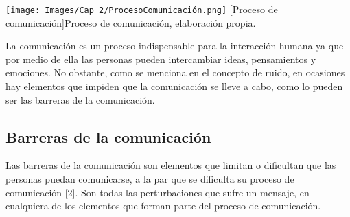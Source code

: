 \begin{center}
    \texttt{[image: Images/Cap 2/ProcesoComunicación.png]}
    [Proceso de comunicación]{Proceso de comunicación, elaboración propia.} 
\end{center}

La comunicación es un proceso indispensable para la interacción humana ya que por medio de ella las personas pueden intercambiar ideas, pensamientos y emociones. No obstante, como se menciona en el concepto de ruido, en ocasiones hay elementos que impiden que la comunicación se lleve a cabo, como lo pueden ser las barreras de la comunicación.
\subsection{Barreras de la comunicación}
Las barreras de la comunicación son elementos que limitan o dificultan que las personas puedan comunicarse, a la par que se dificulta su proceso de comunicación [2]. Son todas las perturbaciones que sufre un mensaje, en cualquiera de los elementos que forman parte del proceso de comunicación.


